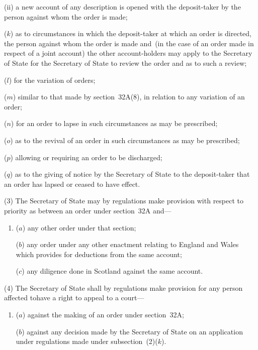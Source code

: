 \documentclass[12pt,a4paper]{article}
\begin{document}
\begin{enumerate}
\begin{enumerate}
(ii) a new account of any description is opened with the deposit-taker by
the person against whom the order is made;
\end{enumerate}

($k$) as to circumstances in which the deposit-taker at which an order is directed, the person against whom the order is made and~(in the case of an order made in respect of a joint account) the other account-holders may apply to the 
Secretary of State  %
for 
the Secretary of State  %
to review the order and as to such a review;

($l$) for the variation of orders;

($m$) similar to that made by section~32A(8), in relation to any variation of an
order;

($n$) for an order to lapse in such circumstances as may be prescribed;

($o$) as to the revival of an order in such circumstances as may be prescribed;

($p$) allowing or requiring an order to be discharged;

($q$) as to the giving of notice by the 
Secretary of State  %
to the deposit-taker that an order has lapsed or ceased to have effect.
\end{enumerate}

(3)
The Secretary of State may by regulations make provision with respect to priority as between an order under section~32A and---
\begin{enumerate}\item[]
($a$) any other order under that section;

($b$) any order under any other enactment relating to England and Wales which
provides for deductions from the same account;

($c$) any diligence done in Scotland against the same account.
\end{enumerate}

(4) The Secretary of State shall by regulations make provision for any person affected tohave a right to appeal to a court---
\begin{enumerate}\item[]
($a$) against the making of an order under section~32A;

($b$) against any decision made by the 
Secretary of State  %
on an application
under regulations made under subsection~(2)($k$).
\end{enumerate}
\end{document}
